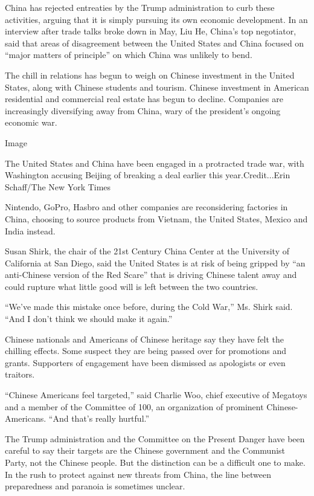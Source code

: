 China has rejected entreaties by the Trump administration to curb these
activities, arguing that it is simply pursuing its own economic
development. In an interview after trade talks broke down in May, Liu
He, China's top negotiator, said that areas of disagreement between the
United States and China focused on ``major matters of principle'' on
which China was unlikely to bend.

The chill in relations has begun to weigh on Chinese investment in the
United States, along with Chinese students and tourism. Chinese
investment in American residential and commercial real estate has begun
to decline. Companies are increasingly diversifying away from China,
wary of the president's ongoing economic war.

Image

The United States and China have been engaged in a protracted trade war,
with Washington accusing Beijing of breaking a deal earlier this
year.Credit...Erin Schaff/The New York Times

Nintendo, GoPro, Hasbro and other companies are reconsidering factories
in China, choosing to source products from Vietnam, the United States,
Mexico and India instead.

Susan Shirk, the chair of the 21st Century China Center at the
University of California at San Diego, said the United States is at risk
of being gripped by ``an anti-Chinese version of the Red Scare'' that is
driving Chinese talent away and could rupture what little good will is
left between the two countries.

``We've made this mistake once before, during the Cold War,'' Ms. Shirk
said. ``And I don't think we should make it again.''

Chinese nationals and Americans of Chinese heritage say they have felt
the chilling effects. Some suspect they are being passed over for
promotions and grants. Supporters of engagement have been dismissed as
apologists or even traitors.

``Chinese Americans feel targeted,'' said Charlie Woo, chief executive
of Megatoys and a member of the Committee of 100, an organization of
prominent Chinese-Americans. ``And that's really hurtful.''

The Trump administration and the Committee on the Present Danger have
been careful to say their targets are the Chinese government and the
Communist Party, not the Chinese people. But the distinction can be a
difficult one to make. In the rush to protect against new threats from
China, the line between preparedness and paranoia is sometimes unclear.

